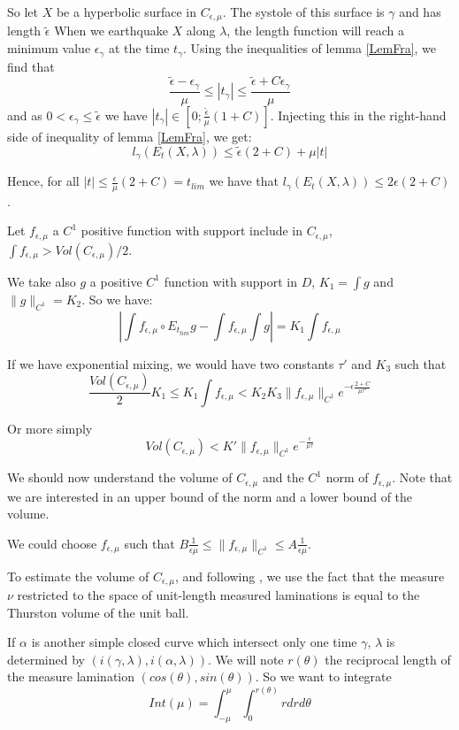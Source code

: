 So let $X$ be a hyperbolic surface in $C_{\epsilon,\mu}$. The systole of this surface is $\gamma$ and has length $\tilde{\epsilon}$
When we earthquake $X$ along $\lambda$, the length function will reach a minimum value $\epsilon_\gamma$ at the time $t_\gamma$. Using the inequalities of lemma \ref{LemFra}, we find that \[
\frac{\tilde{\epsilon}-\epsilon_\gamma}{\mu} \leq |t_\gamma | \leq \frac{\tilde{\epsilon} + C \epsilon_\gamma}{\mu}
\]
and as $0 < \epsilon_\gamma \leq \tilde{\epsilon}$ we have $|t_\gamma| \in [0; \frac{\tilde{\epsilon}}{\mu}(1+C)]$. Injecting this in the right-hand side of inequality of lemma \ref{LemFra}, we get: \[
l_\gamma (E_t (X,\lambda)) \leq \tilde{\epsilon} (2+C) +\mu |t|
\]

Hence, for all $|t| \leq \frac{\epsilon}{\mu}(2+C) = t_{lim}$ we have that $l_\gamma(E_t(X,\lambda)) \leq 2 \epsilon (2+C)$.

Let $f_{\epsilon,\mu}$ a $C^1$ positive function with support include in $C_{\epsilon,\mu}$, $\int f_{\epsilon,\mu} > Vol(C_{\epsilon,\mu})/2$.

We take also $g$ a positive $C^1$ function with support in $D$, $K_1= \int g$ and $\| g \|_{C^1}= K_2$.
So we have:\[
|\int f_{\epsilon,\mu} \circ E_{t_{lim}} g - \int f_{\epsilon,\mu} \int g |=K_1 \int f_{\epsilon,\mu}
\]

If we have exponential mixing, we would have two constants $\tau'$ and $K_3$ such that \[
\frac{Vol(C_{\epsilon,\mu})}{2}K_1 \leq K_1 \int f_{\epsilon,\mu}
< K_2 K_3 \| f_{\epsilon,\mu} \|_{C^1} e^{-\epsilon \frac{2+C}{\mu \tau'}}
\]

Or more simply \begin{equation}
Vol(C_{\epsilon,\mu}) < K' \| f_{\epsilon,\mu} \|_{C^1} e^{-\frac{\epsilon}{\mu \tau}}
\label{equ}
\end{equation}

We should now understand the volume of $C_{\epsilon,\mu}$ and the $C^1$ norm of $f_{\epsilon,\mu}$. Note that we are interested in an upper bound of the norm and a lower bound of the volume.

We could choose $f_{\epsilon,\mu}$ such that
$B \frac{1}{\epsilon \mu} \leq \| f_{\epsilon,\mu} \|_{C^1} \leq A \frac{1}{\epsilon \mu}$.

To estimate the volume of $C_{\epsilon,\mu}$, and following \cite{fu2015cusp}, we use the fact that the measure $\nu$ restricted to the space of unit-length measured laminations is equal to the Thurston volume of the unit ball.

If $\alpha$ is another simple closed curve which intersect only one time $\gamma$, $\lambda$ is determined by $(i(\gamma,\lambda),i(\alpha,\lambda))$. We will note $r(\theta)$ the reciprocal length of the measure lamination $(cos(\theta),sin(\theta))$.
So we want to integrate \[
Int(\mu)=\int_{-\mu}^{\mu} \int_0^{r(\theta)}r dr d \theta
\]

